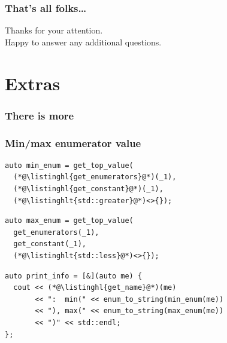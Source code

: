\documentclass[compress,table,xcolor=table]{beamer}
\begin{document}
\begin{frame}
  \frametitle{That's all folks\dots}
  \centering
  \Huge
  Thanks for your attention.\\
  \Large
  Happy to answer any additional questions.
\end{frame}
\section{Extras}
\begin{frame}
  \frametitle{There is more}
\end{frame}
\begin{frame}[fragile]
  \frametitle{Min/max enumerator value}
  \begin{lstlisting}[language=c++2x,basicstyle=\footnotesize\ttfamily]
auto min_enum = get_top_value(
  (*@\listinghl{get_enumerators}@*)(_1),
  (*@\listinghl{get_constant}@*)(_1),
  (*@\listinghlt{std::greater}@*)<>{});
  \end{lstlisting}
  \vfill
  \begin{lstlisting}[language=c++2x,basicstyle=\footnotesize\ttfamily]
auto max_enum = get_top_value(
  get_enumerators(_1),
  get_constant(_1),
  (*@\listinghlt{std::less}@*)<>{});
  \end{lstlisting}
  \vfill
  \begin{lstlisting}[language=c++2x,basicstyle=\footnotesize\ttfamily]
auto print_info = [&](auto me) {
  cout << (*@\listinghl{get_name}@*)(me)
       << ":  min(" << enum_to_string(min_enum(me))
       << "), max(" << enum_to_string(max_enum(me))
       << ")" << std::endl;
};
  \end{lstlisting}
\end{frame}
\end{document}
